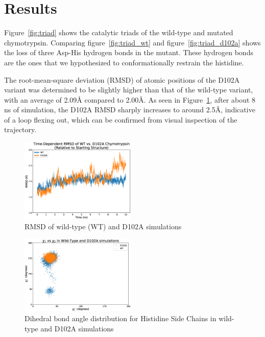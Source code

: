 \documentclass[12pt, twocolumn]{article}
\begin{document}
\section{Results}

Figure~\ref{fig:triad} shows the catalytic triads of the wild-type and mutated
chymotrypsin. Comparing figure~\ref{fig:triad_wt} and
figure~\ref{fig:triad_d102a} shows the loss of three Asp-His hydrogen bonds
in the mutant. These hydrogen bonds are the ones that we hypothesized to
conformationally restrain the histidine.

The root-mean-square deviation (RMSD) of atomic positions of the D102A variant
was determined to be slightly higher than
that of the wild-type variant, with an average of 2.09\AA{} compared to
2.00\AA{}. As seen in Figure~\ref{fig:rmsd}, after about 8 ns of simulation,
the D102A RMSD sharply increases to around 2.5\AA{}, indicative of a loop
flexing out, which can be confirmed from visual inspection of the trajectory.


\begin{figure}[H]
    \centering
        \includegraphics[width=0.49\textwidth]{rmsds.eps}
    \caption{RMSD of wild-type (WT) and D102A simulations}\label{fig:rmsd}
\end{figure}

\begin{figure}[H]
    \centering
        \includegraphics[width=0.49\textwidth]{chi_plot_wt_d102a.eps}
    \caption{Dihedral bond angle distribution for Histidine Side Chains
        in wild-type and D102A simulations}\label{fig:chiplot}
\end{figure}
\end{document}
